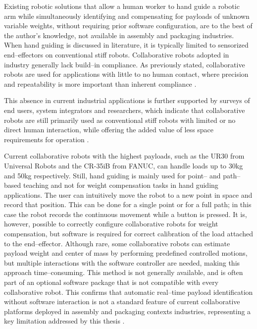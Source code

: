 \documentclass[11pt,a4paper,twoside,openright]{book}
\begin{document}
Existing robotic solutions that allow a human worker to hand guide a robotic arm while simultaneously identifying and compensating for payloads of unknown variable weights, without requiring prior software configuration, are to the best of the author's knowledge, not available in assembly and packaging industries. When hand guiding is discussed in literature, it is typically limited to sensorized end--effectors on conventional stiff robots. Collaborative robots adopted in industry generally lack build--in compliance. As previously stated, collaborative robots are used for applications with little to no human contact, where precision and repeatability is more important than inherent compliance \cite{gregorHandGuidingVirtual2021}\cite{hameedControlSystemDesign2023}.

This absence in current industrial applications is further supported by surveys of end users, system integrators and researchers, which indicate that collaborative robots are still primarily used as conventional stiff robots with limited or no direct human interaction, while offering the added value of less space requirements for operation \cite{montiniCollaborativeRoboticsSurvey2024}.

Current collaborative robots with the highest payloads, such as the UR30 from Universal Robots and the CR-35iB from FANUC, can handle loads up to 30kg and 50kg respectively. Still, hand guiding is mainly used for point-- and path--based teaching and not for weight compensation tasks in hand guiding applications. The user can intuitively move the robot to a new point in space and record that position. This can be done for a single point or for a full path; in this case the robot records the continuous movement while a button is pressed. It is, however, possible to correctly configure collaborative robots for weight compensation, but software is required for correct calibration of the load attached to the end--effector. Although rare, some collaborative robots can estimate payload weight and center of mass by performing predefined controlled motions, but multiple interactions with the software controller are needed, making this approach time--consuming. This method is not generally available, and is often part of an optional software package that is not compatible with every collaborative robot. This confirms that automatic real--time payload identification without software interaction is not a standard feature of current collaborative platforms deployed in assembly and packaging contexts industries, representing a key limitation addressed by this thesis \cite{UR30CollaborativeRobot}\cite{CollaborativeRobotsCobots}\cite{groupHandGuidingRobots2021}\cite{ConfiguringFANUCRobot2026}. 
\end{document}
